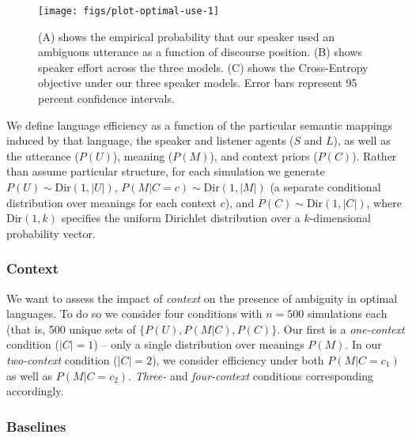 \documentclass[10pt, letterpaper]{article}
\newenvironment{CodeChunk}{}{}
\begin{document}
\begin{CodeChunk}
\begin{figure*}[h]

{\centering \texttt{[image: figs/plot-optimal-use-1]} 

}

\caption[(A) shows the empirical probability that our speaker used an ambiguous utterance as a function of discourse position]{(A) shows the empirical probability that our speaker used an ambiguous utterance as a function of discourse position. (B) shows speaker effort across the three models. (C) shows the Cross-Entropy objective under our three speaker models. Error bars represent 95 percent confidence intervals.}\label{fig:plot-optimal-use}
\end{figure*}
\end{CodeChunk}

We define language efficiency as a function of the particular semantic
mappings induced by that language, the speaker and listener agents
(\(S\) and \(L\)), as well as the utterance (\(P(U)\)), meaning
(\(P(M)\)), and context priors (\(P(C)\)). Rather than assume particular
structure, for each simulation we generate
\(P(U) \sim \text{Dir}(1, |U|)\), \(P(M|C=c) \sim \text{Dir}(1, |M|)\)
(a separate conditional distribution over meanings for each context
\(c\)), and \(P(C) \sim \text{Dir}(1, |C|)\), where \(\text{Dir}(1, k)\)
specifies the uniform Dirichlet distribution over a \(k\)-dimensional
probability vector.\par

\subsubsection{Context}\label{context}

We want to assess the impact of \emph{context} on the presence of
ambiguity in optimal languages. To do so we consider four conditions
with \(n=500\) simulations each (that is, 500 unique sets of
\(\{P(U), P(M|C), P(C)\}\). Our first is a \textit{one-context}
condition (\(|C|=1\)) -- only a single distribution over meanings
\(P(M)\). In our \textit{two-context} condition (\(|C| = 2\)), we
consider efficiency under both \(P(M|C=c_1)\) as well as \(P(M|C=c_2)\).
\textit{Three-} and \textit{four-context} conditions corresponding
accordingly.\par

\subsubsection{Baselines}\label{baselines}
\end{document}
